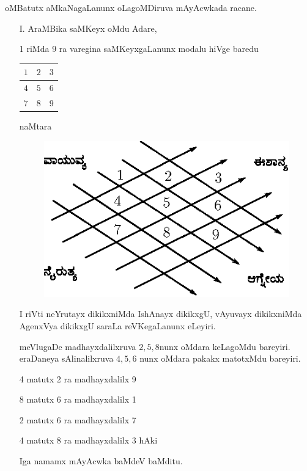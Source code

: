 oMBatutx aMkaNagaLanunx oLagoMDiruva mAyAcwkada racane.

\begin{enumerate}
\item[{\rm I.}] AraMBika saMKeyx oMdu Adare,

 {\rm 1} riMda {\rm 9} ra varegina saMKeyxgaLanunx modalu hiVge baredu

\begin{center}
\begin{tabular}{|>{$}c<{$}|>{$}c<{$}|>{$}c<{$}|}
\hline
1 & 2 & 3\\
\hline
4 & 5 & 6\\
\hline
7 & 8 & 9\\
\hline
\end{tabular}
\end{center}
naMtara
\begin{figure}[H]
\centering
\includegraphics[scale=.8]{src/figures/m_116.eps}
\end{figure}

I riVti neYrutayx dikikxniMda IshAnayx dikikxgU, vAyuvayx dikikxniMda AgenxVya dikikxgU saraLa reVKegaLanunx eLeyiri.

meVlugaDe madhayxdalilxruva $2, 5, 8$nunx oMdara keLagoMdu bareyiri. eraDaneya sAlinalilxruva $4, 5, 6$ nunx oMdara pakakx matotxMdu bareyiri.

{\rm 4} matutx {\rm 2} ra madhayxdalilx {\rm 9}

{\rm 8} matutx {\rm 6} ra madhayxdalilx {\rm 1}

{\rm 2} matutx {\rm 6} ra madhayxdalilx {\rm 7}

{\rm 4} matutx {\rm 8} ra madhayxdalilx {\rm 3} hAki

Iga namamx mAyAcwka baMdeV baMditu.

\hspace{3cm}
%


\end{enumerate}
